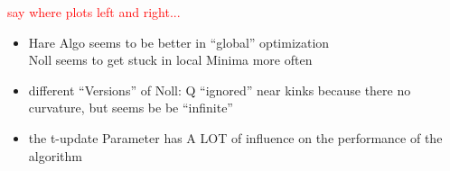 \textcolor{red}{say where plots left and right...}





%
%
%
%
%
%
%
%
%
%

\begin{itemize}
	\item Hare Algo seems to be better in ``global'' optimization \\
	Noll seems to get stuck in local Minima more often
	\item different ``Versions'' of Noll: Q ``ignored'' near kinks because there no curvature, but seems be be ``infinite''
	\item the t-update Parameter has A LOT of influence on the performance of the algorithm
\end{itemize}